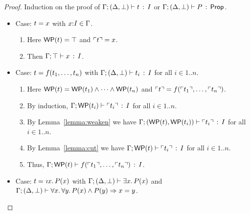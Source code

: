 \documentclass[10pt,a4paper]{article}
\begin{document}
\begin{proof}
  \raggedright Induction on the proof of
  $\Gamma;(\Delta,\bot) \vdash t\, :\, I$ or $\Gamma;(\Delta,\bot) \vdash P\, :\, \mathsf{Prop}$.
  \begin{itemize}
  \item Case: $t = x$ with $x{:}I\in\Gamma$.  
    \begin{enumerate}
      \item
        Here $\mathop{\mathsf{WP}}(t) = \top$ and $\ulcorner t \urcorner = x$.
      \item
        Then $\Gamma;\top \vdash x\, :\, I$.
      \end{enumerate}
  \item Case: $t = f({t}_1,\ldots,{t}_{n})$ with
    $\Gamma;(\Delta,\bot) \vdash t_i\, :\, I$ for all $i\in1..n$.
    \begin{enumerate}
    \item
      Here $\mathop{\mathsf{WP}}(t) =
      \mathop{\mathsf{WP}}(t_1) \wedge \cdots \wedge \mathop{\mathsf{WP}}(t_n)$
      and $\ulcorner t \urcorner = f(\ulcorner t_1 \urcorner,\ldots,\ulcorner t_n \urcorner)$.
    \item 
    	By induction,
        $\Gamma;\mathop{\mathsf{WP}}(t_i) \vdash \ulcorner t_i \urcorner\, :\, I$ for
      all $i\in1..n$.  
    \item 
      By Lemma~\ref{lemma:weaken} we have
      $\Gamma;(\mathop{\mathsf{WP}}(t),\mathop{\mathsf{WP}}(t_i)) \vdash \ulcorner t_i \urcorner\, :\, I$
      for all $i\in1..n$.
    \item
      By Lemma~\ref{lemma:cut} we have
      $\Gamma;\mathop{\mathsf{WP}}(t) \vdash \ulcorner t_i \urcorner\, :\, I$ for
      all $i\in1..n$.  
    \item Thus,
      $\Gamma;\mathop{\mathsf{WP}}(t) \vdash f(\ulcorner t_1 \urcorner,\ldots,\ulcorner t_n \urcorner)\, :\, I$.  
    \end{enumerate}
    
  \goodbreak
    
  \item Case: $\t = \tDesc{\x}{\I}{\p(\x)}$ with
  $\Gamma;(\Delta,\bot) \vdash \exists x.\, P(x)$ and 
  $\Gamma;(\Delta,\bot) \vdash \forall x.\, \forall y.\, P(x) \wedge P(y) \Rightarrow x=y$.


\end{itemize}
\end{proof}
\end{document}
